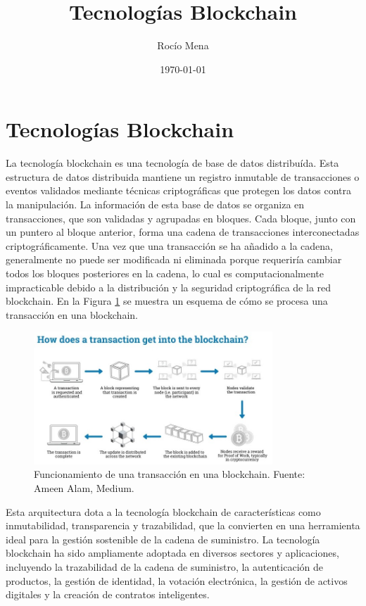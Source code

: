 \documentclass{article}
\title{Tecnologías Blockchain}
\author{Rocío Mena}
\date{\today}
\begin{document}
\maketitle

\section{Tecnologías Blockchain}

La tecnología blockchain es una tecnología de base de datos distribuída. Esta estructura de datos distribuida mantiene un registro inmutable de transacciones o eventos validados mediante técnicas criptográficas que protegen los datos contra la manipulación. La información de esta base de datos se organiza en transacciones, que son validadas y agrupadas en bloques. Cada bloque, junto con un puntero al bloque anterior, forma una cadena de transacciones interconectadas criptográficamente. Una vez que una transacción se ha añadido a la cadena, generalmente no puede ser modificada ni eliminada porque requeriría cambiar todos los bloques posteriores en la cadena, lo cual es computacionalmente impracticable debido a la distribución y la seguridad criptográfica de la red blockchain. En la Figura \ref{fig:blockchain} se muestra un esquema de cómo se procesa una transacción en una blockchain.

\begin{figure}[h]
	\centering
	\includegraphics[width=0.8\textwidth]{./assets/blockchain.jpg}
	\caption{Funcionamiento de una transacción en una blockchain. Fuente: Ameen Alam, Medium.}
	\label{fig:blockchain}
\end{figure}

Esta arquitectura dota a la tecnología blockchain de características como inmutabilidad, transparencia y trazabilidad, que la convierten en una herramienta ideal para la gestión sostenible de la cadena de suministro. La tecnología blockchain ha sido ampliamente adoptada en diversos sectores y aplicaciones, incluyendo la trazabilidad de la cadena de suministro, la autenticación de productos, la gestión de identidad, la votación electrónica, la gestión de activos digitales y la creación de contratos inteligentes.
\end{document}
